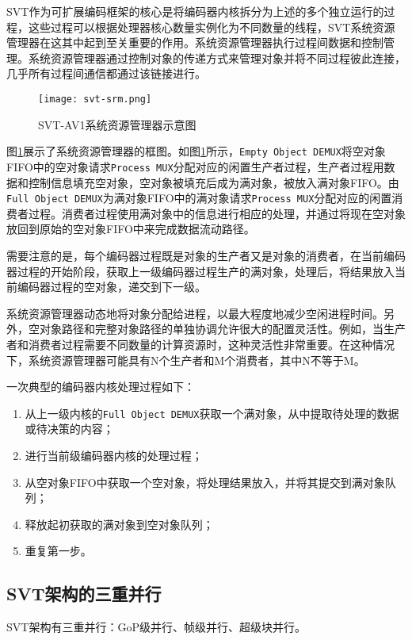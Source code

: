   SVT作为可扩展编码框架的核心是将编码器内核拆分为上述的多个独立运行的过程，这些过程可以根据处理器核心数量实例化为不同数量的线程，SVT系统资源管理器在这其中起到至关重要的作用\cite{EncoderDesignSVTAV1}。系统资源管理器执行过程间数据和控制管理。系统资源管理器通过控制对象的传递方式来管理对象并将不同过程彼此连接，几乎所有过程间通信都通过该链接进行。

  \begin{figure}[!htp]
    \centering
    \texttt{[image: svt-srm.png]}
    \caption{SVT-AV1系统资源管理器示意图\cite{EncoderDesignSVTAV1}}
  \label{fig:svt-srm}
  \end{figure}

  图\ref{fig:svt-srm}展示了系统资源管理器的框图。如图\ref{fig:svt-srm}所示，\texttt{Empty Object DEMUX}将空对象FIFO中的空对象请求\texttt{Process MUX}分配对应的闲置生产者过程，生产者过程用数据和控制信息填充空对象，空对象被填充后成为满对象，被放入满对象FIFO。由\texttt{Full Object DEMUX}为满对象FIFO中的满对象请求\texttt{Process MUX}分配对应的闲置消费者过程。消费者过程使用满对象中的信息进行相应的处理，并通过将现在空对象放回到原始的空对象FIFO中来完成数据流动路径。

  需要注意的是，每个编码器过程既是对象的生产者又是对象的消费者，在当前编码器过程的开始阶段，获取上一级编码器过程生产的满对象，处理后，将结果放入当前编码器过程的空对象，递交到下一级。

  系统资源管理器动态地将对象分配给进程，以最大程度地减少空闲进程时间。另外，空对象路径和完整对象路径的单独协调允许很大的配置灵活性。例如，当生产者和消费者过程需要不同数量的计算资源时，这种灵活性非常重要。在这种情况下，系统资源管理器可能具有N个生产者和M个消费者，其中N不等于M。

  一次典型的编码器内核处理过程如下：
  \begin{enumerate} [label=\arabic*)]
    \item 从上一级内核的\texttt{Full Object DEMUX}获取一个满对象，从中提取待处理的数据或待决策的内容；
    \item 进行当前级编码器内核的处理过程；
    \item 从空对象FIFO中获取一个空对象，将处理结果放入，并将其提交到满对象队列；
    \item 释放起初获取的满对象到空对象队列；
    \item 重复第一步。
  \end{enumerate}

  \subsection{SVT架构的三重并行}
  SVT架构有三重并行：GoP级并行、帧级并行、超级块并行。
